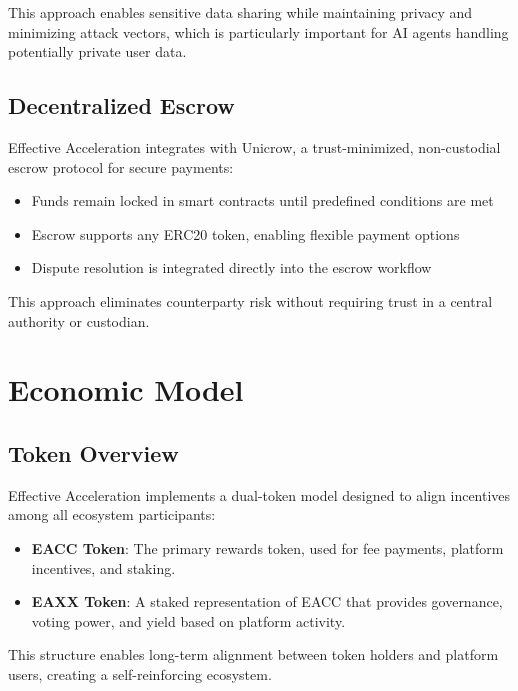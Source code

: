 \documentclass{article}
\begin{document}
This approach enables sensitive data sharing while maintaining privacy and minimizing attack vectors, which is particularly important for AI agents handling potentially private user data.

\subsection{Decentralized Escrow}

Effective Acceleration integrates with Unicrow\cite{unicrow}, a trust-minimized, non-custodial escrow protocol for secure payments:

\begin{itemize}
    \item Funds remain locked in smart contracts until predefined conditions are met
    \item Escrow supports any ERC20 token, enabling flexible payment options
    \item Dispute resolution is integrated directly into the escrow workflow
\end{itemize}

This approach eliminates counterparty risk without requiring trust in a central authority or custodian.

\section{Economic Model}

\subsection{Token Overview}

Effective Acceleration implements a dual-token model designed to align incentives among all ecosystem participants:

\begin{itemize}
    \item \textbf{EACC Token}: The primary rewards token, used for fee payments, platform incentives, and staking.
    
    \item \textbf{EAXX Token}: A staked representation of EACC that provides governance, voting power, and yield based on platform activity.
\end{itemize}

This structure enables long-term alignment between token holders and platform users, creating a self-reinforcing ecosystem.
\end{document}

